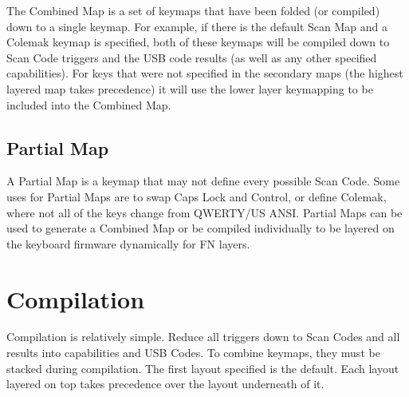 \documentclass{kiibohd-template}
\begin{document}
The Combined Map is a set of keymaps that have been folded (or compiled) down to a single keymap.
For example, if there is the default Scan Map and a Colemak keymap is specified, both of these keymaps will be compiled down to Scan Code triggers and the USB code results (as well as any other specified capabilities).
For keys that were not specified in the secondary maps (the highest layered map takes precedence) it will use the lower layer keymapping to be included into the Combined Map.


\section{Partial Map}

A Partial Map is a keymap that may not define every possible Scan Code.
Some uses for Partial Maps are to swap Caps Lock and Control, or define Colemak, where not all of the keys change from QWERTY/US ANSI.
Partial Maps can be used to generate a Combined Map or be compiled individually to be layered on the keyboard firmware dynamically for FN layers.






\chapter{Compilation}

Compilation is relatively simple.
Reduce all triggers down to Scan Codes and all results into capabilities and USB Codes.
To combine keymaps, they must be stacked during compilation.
The first layout specified is the default.
Each layout layered on top takes precedence over the layout underneath of it.
\end{document}
